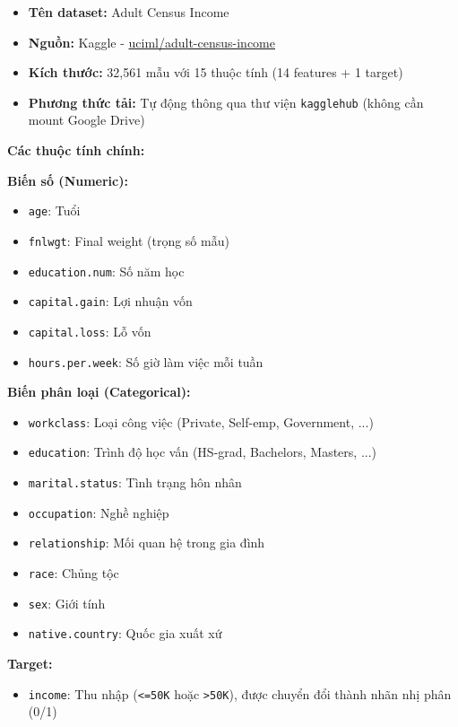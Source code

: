 \documentclass[
]{article}
\providecommand{\tightlist}{%
  \setlength{\itemsep}{0pt}\setlength{\parskip}{0pt}}
\begin{document}
\begin{itemize}
\tightlist
\item
  \textbf{Tên dataset:} Adult Census Income
\item
  \textbf{Nguồn:} Kaggle -
  \href{https://www.kaggle.com/datasets/uciml/adult-census-income}{uciml/adult-census-income}
\item
  \textbf{Kích thước:} 32,561 mẫu với 15 thuộc tính (14 features + 1
  target)
\item
  \textbf{Phương thức tải:} Tự động thông qua thư viện
  \texttt{kagglehub} (không cần mount Google Drive)
\end{itemize}

\textbf{Các thuộc tính chính:}

\textbf{Biến số (Numeric):}

\begin{itemize}
\tightlist
\item
  \texttt{age}: Tuổi
\item
  \texttt{fnlwgt}: Final weight (trọng số mẫu)
\item
  \texttt{education.num}: Số năm học
\item
  \texttt{capital.gain}: Lợi nhuận vốn
\item
  \texttt{capital.loss}: Lỗ vốn
\item
  \texttt{hours.per.week}: Số giờ làm việc mỗi tuần
\end{itemize}

\textbf{Biến phân loại (Categorical):}

\begin{itemize}
\tightlist
\item
  \texttt{workclass}: Loại công việc (Private, Self-emp, Government,
  ...)
\item
  \texttt{education}: Trình độ học vấn (HS-grad, Bachelors, Masters,
  ...)
\item
  \texttt{marital.status}: Tình trạng hôn nhân
\item
  \texttt{occupation}: Nghề nghiệp
\item
  \texttt{relationship}: Mối quan hệ trong gia đình
\item
  \texttt{race}: Chủng tộc
\item
  \texttt{sex}: Giới tính
\item
  \texttt{native.country}: Quốc gia xuất xứ
\end{itemize}

\textbf{Target:}

\begin{itemize}
\tightlist
\item
  \texttt{income}: Thu nhập (\texttt{\textless{}=50K} hoặc
  \texttt{\textgreater{}50K}), được chuyển đổi thành nhãn nhị phân (0/1)
\end{itemize}
\end{document}
